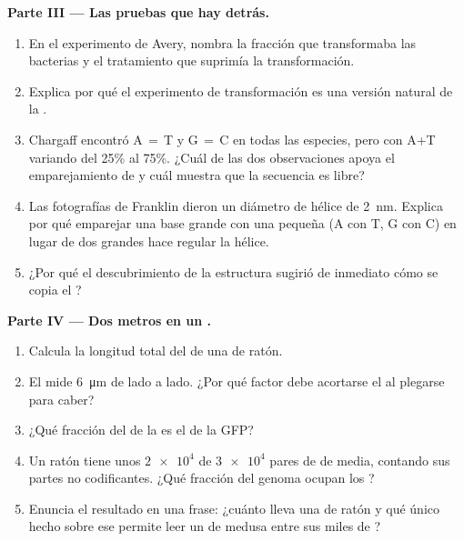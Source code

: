 \begin{problem}
\medskip
\noindent\textbf{Parte III --- Las pruebas que hay detrás.}
\begin{enumerate}[resume]
  \item En el experimento de Avery, nombra la fracción que transformaba
        las bacterias y el tratamiento que suprimía la transformación.
  \item Explica por qué el experimento de transformación es una versión
        natural de la .
  \item Chargaff encontró A$\,=\,$T y G$\,=\,$C en todas las especies,
        pero con A+T variando del 25\% al 75\%. ¿Cuál de las dos
        observaciones apoya el emparejamiento de  y cuál muestra
        que la secuencia es libre?
  \item Las fotografías de Franklin dieron un diámetro de hélice de
        \qty{2}{nm}. Explica por qué emparejar una base grande con una
        pequeña (A con T, G con C) en lugar de dos grandes hace regular
        la hélice.
  \item ¿Por qué el descubrimiento de la estructura sugirió de
        inmediato cómo se copia el ?
\end{enumerate}

\medskip
\noindent\textbf{Parte IV --- Dos metros en un .}
\begin{enumerate}[resume]
  \item Calcula la longitud total del  de una  de ratón.
  \item El  mide \qty{6}{\micro m} de lado a lado. ¿Por qué
        factor debe acortarse el  al plegarse para caber?
  \item ¿Qué fracción del  de la  es el  de la GFP?
  \item Un ratón tiene unos $\num{2e4}$  de $\num{3e4}$ pares de
         de media, contando sus partes no codificantes. ¿Qué
        fracción del genoma ocupan los ?
  \item Enuncia el resultado en una frase: ¿cuánto  lleva una 
        de ratón y qué único hecho sobre ese  permite leer un  de
        medusa entre sus miles de ?
\end{enumerate}
\end{problem}
